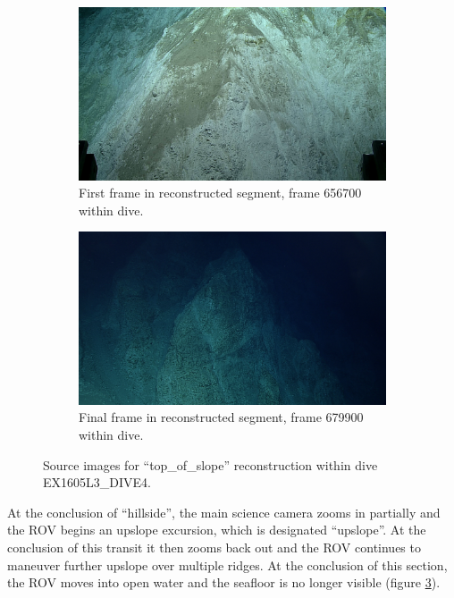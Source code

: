 \documentclass[letterpaper,12pt]{article}
\begin{document}
\begin{figure}
    \centering
    \begin{subfigure}[b]{0.48\textwidth}
        \includegraphics[width=\textwidth]{images/image_656700.png}
        \caption{First frame in reconstructed segment, frame 656700 within dive.}
        \label{fig:ex1605l3_dive4_top_of_slope_begin}
    \end{subfigure}
    \begin{subfigure}[b]{0.48\textwidth}
        \includegraphics[width=\textwidth]{images/image_679900.png}
        \caption{Final frame in reconstructed segment, frame 679900 within dive.}
        \label{fig:ex1605l3_dive4_top_of_slope_end}
    \end{subfigure}
    \caption{Source images for ``top\_of\_slope'' reconstruction within dive EX1605L3\_DIVE4.}
\end{figure}

At the conclusion of ``hillside'', the main science camera zooms in partially and the ROV begins an upslope excursion, which is designated ``upslope''.  At the conclusion of this transit it then zooms back out and the ROV continues to maneuver further upslope over multiple ridges.  At the conclusion of this section, the ROV moves into open water and the seafloor is no longer visible (figure \ref{fig:ex1605l3_dive4_top_of_slope_end}).
\end{document}
